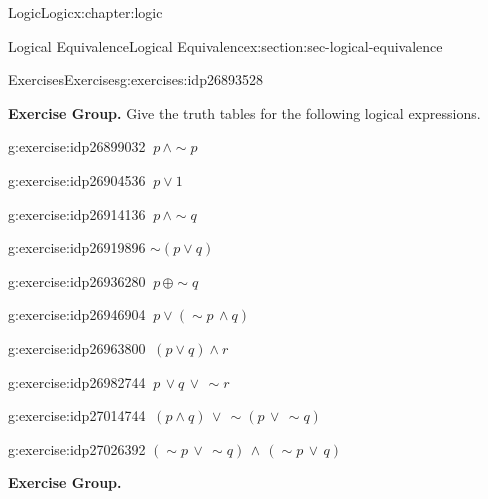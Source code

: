 \documentclass[twoside,10pt,]{book}
\numberwithin{equation}{section}
\begin{document}
\begin{chapterptx}{Logic}{}{Logic}{}{}{x:chapter:logic}
\begin{sectionptx}{Logical Equivalence}{}{Logical Equivalence}{}{}{x:section:sec-logical-equivalence}
\typeout{************************************************}
%
\begin{exercises-subsection}{Exercises}{}{Exercises}{}{}{g:exercises:idp26893528}
\par\medskip\noindent%
\textbf{Exercise Group.}\space\space%
Give the truth tables for the following logical expressions.\begin{exercisegroup}
\begin{divisionexerciseeg}{1}{}{}{g:exercise:idp26899032}%
\(\ p\,{\wedge}\sim\!{p}\)\end{divisionexerciseeg}%
\begin{divisionexerciseeg}{2}{}{}{g:exercise:idp26904536}%
\(\ p{\vee} 1\)\end{divisionexerciseeg}%
\begin{divisionexerciseeg}{3}{}{}{g:exercise:idp26914136}%
\(\ p\,{\wedge}\sim\!{q}\)\end{divisionexerciseeg}%
\begin{divisionexerciseeg}{4}{}{}{g:exercise:idp26919896}%
\(\sim\!(p{\vee} q)\)\end{divisionexerciseeg}%
\begin{divisionexerciseeg}{5}{}{}{g:exercise:idp26936280}%
\(\ p\,{\oplus}\sim\!{q}\)\end{divisionexerciseeg}%
\begin{divisionexerciseeg}{6}{}{}{g:exercise:idp26946904}%
\(\ p{\vee}(\sim\!{p}\,{\wedge} q)\)\end{divisionexerciseeg}%
\begin{divisionexerciseeg}{7}{}{}{g:exercise:idp26963800}%
\(\ (p{\vee} q){\wedge} r\)\end{divisionexerciseeg}%
\begin{divisionexerciseeg}{8}{}{}{g:exercise:idp26982744}%
\(\ p\,{\vee} q\,{\vee}\, \sim\!{r}\)\end{divisionexerciseeg}%
\begin{divisionexerciseeg}{9}{}{}{g:exercise:idp27014744}%
\(\ (p{\wedge} q)\,{\vee}\,\sim\!(p\,{\vee}\,\sim\!{q})\)\end{divisionexerciseeg}%
\begin{divisionexerciseeg}{10}{}{}{g:exercise:idp27026392}%
\((\sim\!{p}\,{\vee}\,\sim\!{q})\,{\wedge}\,(\sim\!{p}\,{\vee}\,q)\)\end{divisionexerciseeg}%
\end{exercisegroup}
\par\medskip\noindent
\par\medskip\noindent%
\textbf{Exercise Group.}\space\space%

\end{exercises-subsection}
\end{sectionptx}
\end{chapterptx}
\end{document}
